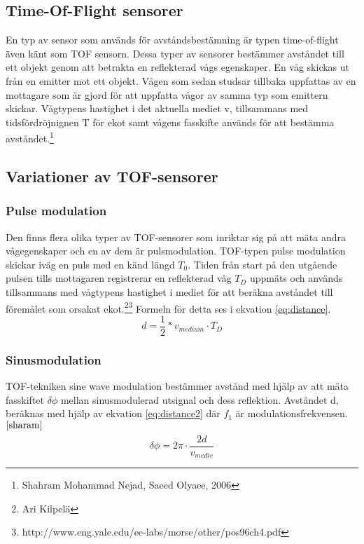\documentclass[a4paper,12pt,fleqn]{article}
\begin{document}
\subsection{Time-Of-Flight sensorer}
En typ av sensor som används för avståndsbestämning är typen time-of-flight även känt som TOF sensorn. Dessa typer av sensorer bestämmer avståndet till ett objekt genom att betrakta en reflekterad vågs egenskaper. 
En våg skickas ut från en emitter mot ett objekt. Vågen som sedan studsar tillbaka uppfattas av en mottagare som är gjord för att uppfatta vågor av samma typ som emittern skickar. Vågtypens hastighet i det aktuella mediet v, tillsammans med tidsfördröjnignen T för ekot samt vågens fasskifte används för att bestämma avståndet.\footnote{\label{sharam}Shahram Mohammad Nejad, Saeed Olyaee, 2006}



\subsection{Variationer av TOF-sensorer}

\subsubsection{Pulse modulation}
Den finns flera olika typer av TOF-sensorer som inriktar sig på att mäta andra vågegenskaper och en av dem är pulsmodulation.
TOF-typen pulse modulation skickar iväg en puls med en känd längd \begin{math}T_{0}\end{math}. Tiden från start på den utgående pulsen tills mottagaren registrerar en reflekterad våg \begin{math}T_{D}\end{math} uppmäts och används tillsammans med vågtypens hastighet i mediet för att beräkna avståndet till föremålet som orsakat ekot.\footnote{Ari Kilpelä}\footnote{http://www.eng.yale.edu/ee-labs/morse/other/pos96ch4.pdf} Formeln för detta ses i ekvation \ref{eq:distance}.
\begin{equation}
\label{eq:distance}
d = \frac{1}{2}*v_{medium} \cdot T_D
\end{equation}

\subsubsection{Sinusmodulation}
TOF-tekniken sine wave modulation bestämmer avstånd med hjälp av att mäta fasskiftet \begin{math}\delta\phi\end{math} mellan sinusmodulerad utsignal och dess reflektion. Avståndet d, beräknas med hjälp av ekvation \ref{eq:distance2} där \begin{math}f_1\end{math} är modulationsfrekvensen. $^{\ref{sharam}}$
\begin{equation}
\label{eq:distance2}
\delta\phi = 2\pi \cdot \frac{2d}{v_{medie}}
\end{equation}
\end{document}
